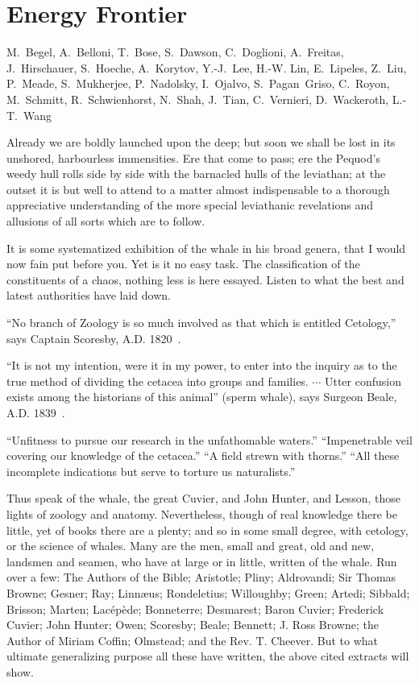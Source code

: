 
\setcounter{chapter}{1}

\chapter{Energy Frontier}

   {M.~Begel, A.~Belloni, T.~Bose, S.~Dawson, C.~Doglioni, A.~Freitas,  J.~Hirschauer, S.~Hoeche,
A.~Korytov,  Y.-J.~Lee, H.-W. Lin,  E.~Lipeles, Z.~Liu,  P.~Meade, S.~Mukherjee, P.~Nadolsky,  I.~Ojalvo, S.~Pagan~Griso, C.~Royon,
M.~Schmitt, R.~Schwienhorst,  N.~Shah,
J.~Tian, C.~Vernieri, D.~Wackeroth, L.-T.~Wang}


Already we are boldly launched upon the deep; but soon we shall be lost in its unshored, harbourless immensities. Ere that come to pass; ere the Pequod’s weedy hull rolls side by side with the barnacled hulls of the leviathan; at the outset it is but well to attend to a matter almost indispensable to a thorough appreciative understanding of the more special leviathanic revelations and allusions of all sorts which are to follow.

It is some systematized exhibition of the whale in his broad genera, that I would now fain put before you. Yet is it no easy task. The classification of the constituents of a chaos, nothing less is here essayed. Listen to what the best and latest authorities have laid down.

``No branch of Zoology is so much involved as that which is entitled Cetology,'' says Captain Scoresby, A.D. 1820~\cite{Scoresby}.

``It is not my intention, were it in my power, to enter into the inquiry as to the true method of dividing the cetacea into groups and families. $\cdots$ Utter confusion exists among the historians of this animal'' (sperm whale), says Surgeon Beale, A.D. 1839~\cite{Beale}.

``Unfitness to pursue our research in the unfathomable waters.'' ``Impenetrable veil covering our knowledge of the cetacea.''  ``A field strewn with thorns.'' ``All these incomplete indications but serve to torture us naturalists.''~\cite{Cuvier,Hunter,Lesson}

Thus speak of the whale, the great Cuvier, and John Hunter, and Lesson, those lights of zoology and anatomy. Nevertheless, though of real knowledge there be little, yet of books there are a plenty; and so in some small degree, with cetology, or the science of whales. Many are the men, small and great, old and new, landsmen and seamen, who have at large or in little, written of the whale. Run over a few: The Authors of the Bible; Aristotle; Pliny; Aldrovandi; Sir Thomas Browne; Gesner; Ray; Linnæus; Rondeletius; Willoughby; Green; Artedi; Sibbald; Brisson; Marten; Lacépède; Bonneterre; Desmarest; Baron Cuvier; Frederick Cuvier; John Hunter; Owen; Scoresby; Beale; Bennett; J. Ross Browne; the Author of Miriam Coffin; Olmstead; and the Rev. T. Cheever. But to what ultimate generalizing purpose all these have written, the above cited extracts will show.

